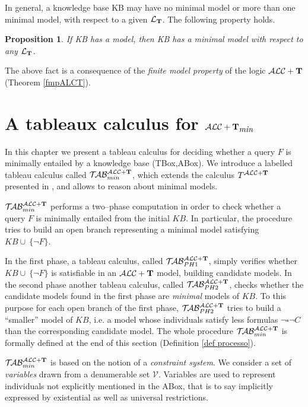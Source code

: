\documentclass[a4paper, 11pt, oneside]{duthesis}
\newcommand{\tip}{{\bf T}}
\newcommand{\alct}{\mathcal{ALC}+\tip}
\newcommand{\alctmin}{\mathcal{ALC}+\tip_{\mbox{\em min}}}
\newcommand{\unione} {\cup}
\newcommand{\nott} {\lnot}
\newcommand{\bbox}{\square}
\newcommand{\ellet} {\mathcal{L}_{\bf T}}
\newcommand{\nuovoc}{\mathrel{{\mathcal{T}\!\mathcal{AB}}}_{min}^{\mathcal{ALC}+\mbox{\scriptsize $\tip$}}}
\newcommand{\primo}{\mathrel{{\mathcal{T}\!\mathcal{AB}}}_{PH 1}^{\mathcal{ALC}+\mbox{\scriptsize $\tip$}}}
\newcommand{\secondo}{\mathrel{{\mathcal{T}\!\mathcal{AB}}}_{PH 2}^{\mathcal{ALC}+\mbox{\scriptsize $\tip$}}}
\newcommand{\calcolo}{T^{\mathcal{ALC}+\mbox{\scriptsize $\tip$}}}
\newtheorem{proposition}{Proposition}
\newcounter{posu}
\newtheorem{proposition}[posu]{Proposition}
\begin{document}
\vspace{0.35cm}

\noindent In general, a knowledge base KB may have no minimal model or more than one minimal model, with respect to a given $\ellet$. The following property holds.

\begin{proposition}\label{proprModMinimali1}
If \emph{KB} has a model, then \emph{KB} has a minimal model with respect to any $\ellet$.
\end{proposition}

The above fact  is  a consequence of the \emph{finite model property} of the logic $\alct$ (Theorem \ref{fmpALCT}).




\chapter{A tableaux calculus for $\alctmin$}\label{tab}

In this chapter we present a tableau calculus for deciding whether a query $F$ is minimally entailed by a knowledge base (TBox,ABox).
We introduce a labelled tableau calculus  called $\nuovoc$, which extends the calculus $\calcolo$ presented in \cite{FI09}, and allows to reason about minimal models.

$\nuovoc$ performs a two--phase computation in order to check whether a query $F$ is minimally entailed from the initial $KB$.
In particular, the procedure tries to build an open branch representing a minimal model satisfying $KB \unione \ \{\nott F\}$.

\noindent In the first phase, a tableau calculus, called $\primo$, simply verifies whether $KB \unione \ \{\nott F\}$ is satisfiable in an $\alct$ model, building candidate models.
In the second phase another tableau calculus, called $\secondo$, checks whether the candidate models found in the first phase are \emph{minimal} models of $KB$.
To this purpose for each open branch of the first phase, $\secondo$ tries to build a ``smaller'' model of $KB$, i.e. a model whose individuals satisfy less formulas $\nott \bbox \nott C$ than the corresponding candidate model.
The whole procedure $\nuovoc$ is formally defined at the end of this section (Definition \ref{def processo}).

$\nuovoc$ is based on the notion of a \emph{constraint system}.
We consider a set of \emph{variables} drawn from a denumerable set $\mathcal{V}$.
Variables are used to represent individuals not explicitly mentioned in the ABox, that is to say implicitly expressed by existential as well as universal restrictions.
\end{document}
